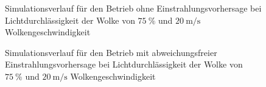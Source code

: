 \begin{figure}[h!]
    \centering
    \setlength{\fboxsep}{1pt}
    \setlength{\fboxrule}{1pt}
    \caption[Simulationsverlauf für den Betrieb ohne Einstrahlungsvorhersage bei Lichtdurchlässigkeit der Wolke von $\SI{75}{\percent}$ und $\SI{20}{\metre\per\second}$ Wolkengeschwindigkeit]{Simulationsverlauf für den Betrieb ohne Einstrahlungsvorhersage bei Lichtdurchlässigkeit der Wolke von $\SI{75}{\percent}$ und $\SI{20}{\metre\per\second}$ Wolkengeschwindigkeit}
    \label{fig_unwissend7520}
\end{figure}

\begin{figure}[h!]
    \centering
    \setlength{\fboxsep}{1pt}
    \setlength{\fboxrule}{1pt}
    \caption[Simulationsverlauf für den Betrieb mit abweichungsfreier Einstrahlungsvorhersage bei Lichtdurchlässigkeit der Wolke von $\SI{75}{\percent}$ und $\SI{20}{\metre\per\second}$ Wolkengeschwindigkeit]{Simulationsverlauf für den Betrieb mit abweichungsfreier Einstrahlungsvorhersage bei Lichtdurchlässigkeit der Wolke von $\SI{75}{\percent}$ und $\SI{20}{\metre\per\second}$ Wolkengeschwindigkeit}
    \label{fig_allwissend7520}
\end{figure}


